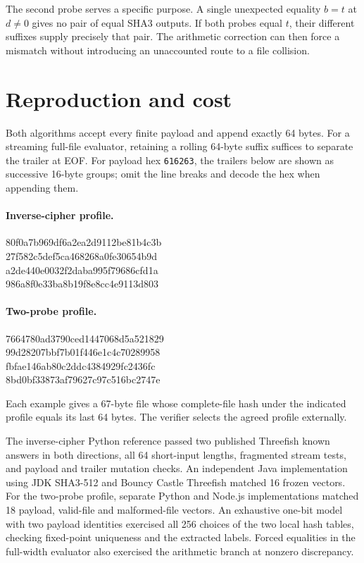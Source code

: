 \documentclass[10pt,twocolumn,letterpaper]{article}
\begin{document}
The second probe serves a specific purpose. A single unexpected equality \(b=t\) at \(d\ne0\) gives no pair of equal SHA3 outputs. If both probes equal \(t\), their different suffixes supply precisely that pair. The arithmetic correction can then force a mismatch without introducing an unaccounted route to a file collision.

\section{Reproduction and cost}
Both algorithms accept every finite payload and append exactly 64 bytes. For a streaming full-file evaluator, retaining a rolling 64-byte suffix suffices to separate the trailer at EOF. For payload hex \texttt{616263}, the trailers below are shown as successive 16-byte groups; omit the line breaks and decode the hex when appending them.

\paragraph{Inverse-cipher profile.}
\begin{center}\small\ttfamily
80f0a7b969df6a2ea2d9112be81b4c3b\\
27f582c5def5ca468268a0fe30654b9d\\
a2de440e0032f2daba995f79686cfd1a\\
986a8f0e33ba8b19f8e8cc4e9113d803
\end{center}
\paragraph{Two-probe profile.}
\begin{center}\small\ttfamily
7664780ad3790ced1447068d5a521829\\
99d28207bbf7b01f446e1c4c70289958\\
fbfae146ab80c2ddc4384929fc2436fc\\
8bd0bf33873af79627c97c516bc2747e
\end{center}
Each example gives a 67-byte file whose complete-file hash under the indicated profile equals its last 64 bytes. The verifier selects the agreed profile externally.

The inverse-cipher Python reference passed two published Threefish known answers in both directions, all 64 short-input lengths, fragmented stream tests, and payload and trailer mutation checks. An independent Java implementation using JDK SHA3-512 and Bouncy Castle Threefish matched 16 frozen vectors. For the two-probe profile, separate Python and Node.js implementations matched 18 payload, valid-file and malformed-file vectors. An exhaustive one-bit model with two payload identities exercised all 256 choices of the two local hash tables, checking fixed-point uniqueness and the extracted labels. Forced equalities in the full-width evaluator also exercised the arithmetic branch at nonzero discrepancy.
\end{document}
